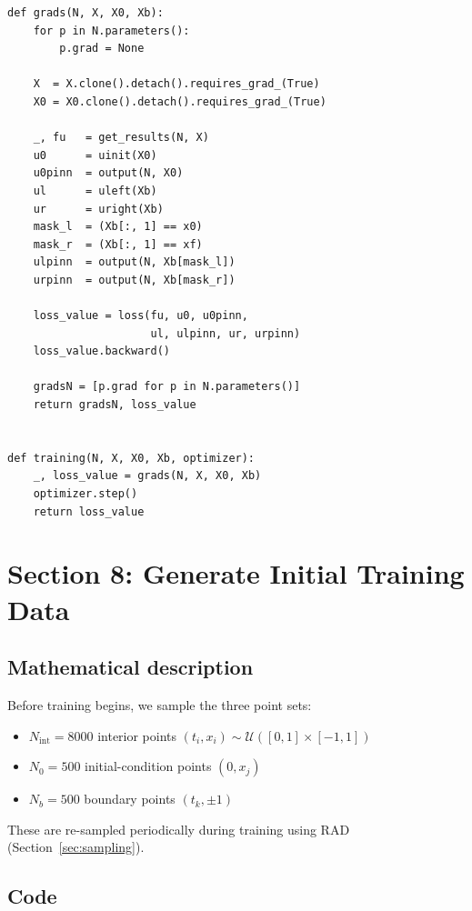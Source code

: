 \documentclass[11pt,a4paper]{article}
\begin{document}
\begin{lstlisting}
def grads(N, X, X0, Xb):
    for p in N.parameters():
        p.grad = None

    X  = X.clone().detach().requires_grad_(True)
    X0 = X0.clone().detach().requires_grad_(True)

    _, fu   = get_results(N, X)
    u0      = uinit(X0)
    u0pinn  = output(N, X0)
    ul      = uleft(Xb)
    ur      = uright(Xb)
    mask_l  = (Xb[:, 1] == x0)
    mask_r  = (Xb[:, 1] == xf)
    ulpinn  = output(N, Xb[mask_l])
    urpinn  = output(N, Xb[mask_r])

    loss_value = loss(fu, u0, u0pinn,
                      ul, ulpinn, ur, urpinn)
    loss_value.backward()

    gradsN = [p.grad for p in N.parameters()]
    return gradsN, loss_value


def training(N, X, X0, Xb, optimizer):
    _, loss_value = grads(N, X, X0, Xb)
    optimizer.step()
    return loss_value
\end{lstlisting}


\section{Section 8: Generate Initial Training Data}
\label{sec:data}

\subsection*{Mathematical description}

Before training begins, we sample the three point sets:
\begin{itemize}[nosep]
  \item $N_{\mathrm{int}} = 8000$ interior points
        $(t_i, x_i) \sim \mathcal{U}([0,1]\times[-1,1])$
  \item $N_0 = 500$ initial-condition points $(0, x_j)$
  \item $N_b = 500$ boundary points $(t_k, \pm 1)$
\end{itemize}

These are re-sampled periodically during training using RAD (Section~\ref{sec:sampling}).

\subsection*{Code}
\end{document}
